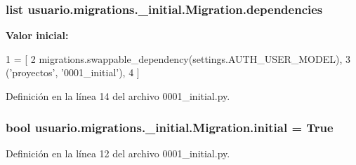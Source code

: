 \subsubsection[{\texorpdfstring{dependencies}{dependencies}}]{\setlength{\rightskip}{0pt plus 5cm}list usuario.\+migrations.\+\_\+initial.\+Migration.\+dependencies\hspace{0.3cm}{\ttfamily [static]}}\hypertarget{classusuario_1_1migrations_1_10001__initial_1_1_migration_a32994120f3e7f243508e979f839b7733}{}\label{classusuario_1_1migrations_1_10001__initial_1_1_migration_a32994120f3e7f243508e979f839b7733}
{\bfseries Valor inicial\+:}
\begin{DoxyCode}
1 = [
2         migrations.swappable\_dependency(settings.AUTH\_USER\_MODEL),
3         (\textcolor{stringliteral}{'proyectos'}, \textcolor{stringliteral}{'0001\_initial'}),
4     ]
\end{DoxyCode}


Definición en la línea 14 del archivo 0001\+\_\+initial.\+py.

\subsubsection[{\texorpdfstring{initial}{initial}}]{\setlength{\rightskip}{0pt plus 5cm}bool usuario.\+migrations.\+\_\+initial.\+Migration.\+initial = True\hspace{0.3cm}{\ttfamily [static]}}\hypertarget{classusuario_1_1migrations_1_10001__initial_1_1_migration_a01da22f440a0a2a8568d17e4c69a0c3d}{}\label{classusuario_1_1migrations_1_10001__initial_1_1_migration_a01da22f440a0a2a8568d17e4c69a0c3d}


Definición en la línea 12 del archivo 0001\+\_\+initial.\+py.

